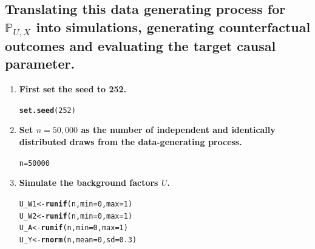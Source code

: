 \documentclass{article}\usepackage[]{graphicx}\usepackage[]{xcolor}
\makeatletter
\newcommand{\hlnum}[1]{\textcolor[rgb]{0.686,0.059,0.569}{#1}}%
\newcommand{\hlstd}[1]{\textcolor[rgb]{0.345,0.345,0.345}{#1}}%
\newcommand{\hlkwb}[1]{\textcolor[rgb]{0.69,0.353,0.396}{#1}}%
\newcommand{\hlkwc}[1]{\textcolor[rgb]{0.333,0.667,0.333}{#1}}%
\newcommand{\hlkwd}[1]{\textcolor[rgb]{0.737,0.353,0.396}{\textbf{#1}}}%
\newenvironment{kframe}{%
 \def\at@end@of@kframe{}%
 \ifinner\ifhmode%
  \def\at@end@of@kframe{\end{minipage}}%
  \begin{minipage}{\columnwidth}%
 \fi\fi%
 \def\FrameCommand##1{\hskip\@totalleftmargin \hskip-\fboxsep
 \colorbox{shadecolor}{##1}\hskip-\fboxsep
     \hskip-\linewidth \hskip-\@totalleftmargin \hskip\columnwidth}%
 \MakeFramed {\advance\hsize-\width
   \@totalleftmargin\z@ \linewidth\hsize
   \@setminipage}}%
 {\par\unskip\endMakeFramed%
 \at@end@of@kframe}
\newenvironment{knitrout}{}{} %
\makeatother
\begin{document}
  \subsection{Translating this data generating process for $\mathbb{P}_{U,X}$ into simulations, generating counterfactual outcomes and evaluating the target causal parameter.}
  
    \begin{enumerate}[label=\textbf{\arabic*.}]
    
      \item \textbf{First set the seed to 252.}
      
\begin{knitrout}
\color{fgcolor}\begin{kframe}
\begin{alltt}
\hlkwd{set.seed}\hlstd{(}\hlnum{252}\hlstd{)}
\end{alltt}
\end{kframe}
\end{knitrout}
      
      \item \textbf{Set $n = 50,000$ as the number of independent and identically distributed draws from the data-generating process.}
      
\begin{knitrout}
\color{fgcolor}\begin{kframe}
\begin{alltt}
\hlstd{n} \hlkwb{=} \hlnum{50000}
\end{alltt}
\end{kframe}
\end{knitrout}
      
      \item \textbf{Simulate the background factors $U$.}
      
\begin{knitrout}
\color{fgcolor}\begin{kframe}
\begin{alltt}
\hlstd{U_W1} \hlkwb{<-} \hlkwd{runif}\hlstd{(n,} \hlkwc{min} \hlstd{=} \hlnum{0}\hlstd{,} \hlkwc{max} \hlstd{=} \hlnum{1}\hlstd{)}
\hlstd{U_W2} \hlkwb{<-} \hlkwd{runif}\hlstd{(n,} \hlkwc{min} \hlstd{=} \hlnum{0}\hlstd{,} \hlkwc{max} \hlstd{=} \hlnum{1}\hlstd{)}
\hlstd{U_A} \hlkwb{<-} \hlkwd{runif}\hlstd{(n,} \hlkwc{min} \hlstd{=} \hlnum{0}\hlstd{,} \hlkwc{max} \hlstd{=} \hlnum{1}\hlstd{)}
\hlstd{U_Y} \hlkwb{<-} \hlkwd{rnorm}\hlstd{(n,} \hlkwc{mean} \hlstd{=} \hlnum{0}\hlstd{,} \hlkwc{sd} \hlstd{=} \hlnum{0.3}\hlstd{)}
\end{alltt}
\end{kframe}
\end{knitrout}
      

\end{enumerate}
\end{document}
